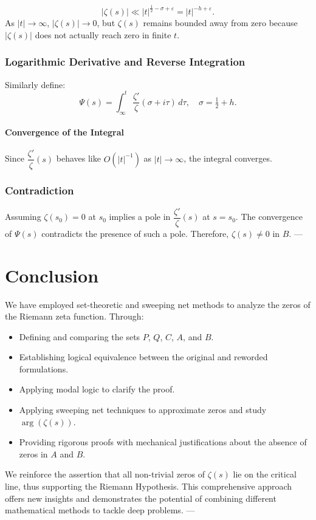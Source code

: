 \documentclass{article}
\begin{document}
\[|\zeta(s)| \ll |t|^{\frac{1}{2} - \sigma + \varepsilon} = |t|^{-h + \varepsilon}.
\] As $|t| \to \infty$, $|\zeta(s)| \to 0$, but $\zeta(s)$ remains bounded away from zero because $|\zeta(s)|$ does not actually reach zero in finite $t$. \subsubsection{Logarithmic Derivative and Reverse Integration} Similarly define: \[
\Psi(s) = \int_{\infty}^{t} \dfrac{\zeta'}{\zeta}(\sigma + i\tau) \, d\tau, \quad \sigma = \tfrac{1}{2} + h.
\] \paragraph{Convergence of the Integral} Since $\dfrac{\zeta'}{\zeta}(s)$ behaves like $O(|t|^{-1})$ as $|t| \to \infty$, the integral converges. \subsubsection{Contradiction} Assuming $\zeta(s_0) = 0$ at $s_0$ implies a pole in $\dfrac{\zeta'}{\zeta}(s)$ at $s = s_0$. The convergence of $\Psi(s)$ contradicts the presence of such a pole. Therefore, $\zeta(s) \neq 0$ in $B$. --- \section{Conclusion} We have employed set-theoretic and sweeping net methods to analyze the zeros of the Riemann zeta function. Through: \begin{itemize} \item Defining and comparing the sets $P$, $Q$, $C$, $A$, and $B$. \item Establishing logical equivalence between the original and reworded formulations. \item Applying modal logic to clarify the proof. \item Applying sweeping net techniques to approximate zeros and study $\arg(\zeta(s))$. \item Providing rigorous proofs with mechanical justifications about the absence of zeros in $A$ and $B$.
\end{itemize} We reinforce the assertion that all non-trivial zeros of $\zeta(s)$ lie on the critical line, thus supporting the Riemann Hypothesis. This comprehensive approach offers new insights and demonstrates the potential of combining different mathematical methods to tackle deep problems. ---
\end{document}
